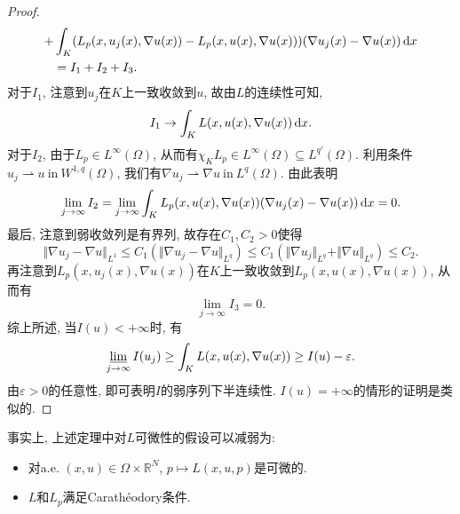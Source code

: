 \begin{theorem}
\begin{proof}
\begin{align*}
            + &\int_K(L_p(x, u_j(x), \nabla u(x)) - L_p(x, u(x), \nabla u(x)))(\nabla u_j(x) - \nabla u(x)) \,{\rm d}x \\ 
            &= I_1 + I_2 + I_3.
        \end{align*}
        对于$I_1$, 注意到$u_j$在$K$上一致收敛到$u$, 故由$L$的连续性可知, 
        \begin{equation*}
            I_1 \rightarrow \int_KL(x, u(x), \nabla u(x)) \,{\rm d}x.
        \end{equation*}
        对于$I_2$, 由于$L_p \in L^{\infty}(\Omega)$, 从而有$\chi_KL_p \in L^{\infty}(\Omega) \subseteq L^{q'}(\Omega)$.
        利用条件$u_j \rightharpoonup u \ \text{in}\ W^{1, q}(\Omega)$, 我们有$\nabla u_j \rightharpoonup \nabla u\ \text{in}\ L^q(\Omega)$.
        由此表明 
        \begin{equation*}
            \lim\limits_{j \rightarrow \infty}I_2 = \lim\limits_{j \rightarrow \infty}\int_KL_p(x, u(x), \nabla u(x))(\nabla u_j(x) - \nabla u(x)) \,{\rm d}x = 0.
        \end{equation*}
        最后, 注意到弱收敛列是有界列, 故存在$C_1, C_2 > 0$使得 
        \begin{equation*}
            \Vert \nabla u_j - \nabla u\Vert_{L^1} \leq C_1(\Vert \nabla u_j - \nabla u\Vert_{L^q}) \leq C_1(\Vert \nabla u_j\Vert_{L^q} + \Vert \nabla u\Vert_{L^q}) \leq C_2.
        \end{equation*}
        再注意到$L_p(x, u_j(x), \nabla u(x))$在$K$上一致收敛到$L_p(x, u(x), \nabla u(x))$, 从而有 
        \begin{equation*}
            \lim\limits_{j \rightarrow \infty}I_3 = 0.
        \end{equation*}
        综上所述, 当$I(u) < +\infty$时, 有 
        \begin{equation*}
            \varliminf\limits_{j \rightarrow \infty}I(u_j) \geq \int_KL(x, u(x), \nabla u(x)) \geq I(u) - \varepsilon.
        \end{equation*}
        由$\varepsilon > 0$的任意性, 即可表明$I$的弱序列下半连续性. $I(u) = +\infty$的情形的证明是类似的.
    \end{proof}
\end{theorem}

\begin{remark}
    事实上, 上述定理中对$L$可微性的假设可以减弱为:
    \begin{itemize}
        \item 对a.e. $(x, u) \in \Omega \times \mathbb{R}^N$, $p \mapsto L(x, u, p)$是可微的.
        \item $L$和$L_p$满足Carathéodory条件.
    \end{itemize}
\end{remark}

